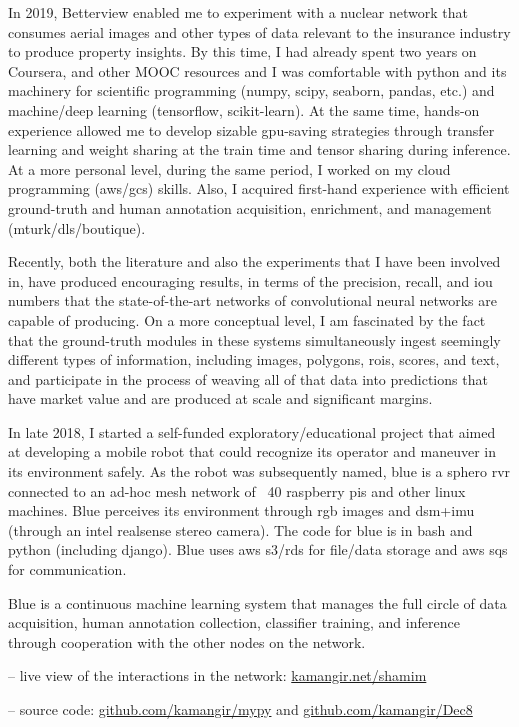 \osspacing
In 2019, Betterview enabled me to experiment with a nuclear network that consumes aerial images and other types of data relevant to the insurance industry to produce property insights. By this time, I had already spent two years on Coursera, and other MOOC resources and I was comfortable with python and its machinery for scientific programming (numpy, scipy, seaborn, pandas, etc.) and machine/deep learning (tensorflow, scikit-learn). At the same time, hands-on experience allowed me to develop sizable gpu-saving strategies through transfer learning and weight sharing at the train time and tensor sharing during inference. At a more personal level, during the same period, I worked on my cloud programming (aws/gcs) skills. Also, I acquired first-hand experience with efficient ground-truth and human annotation acquisition, enrichment, and management (mturk/dls/boutique).

\osspacing
Recently, both the literature and also the experiments that I have been involved in, have produced encouraging results, in terms of the precision, recall, and iou numbers that the state-of-the-art networks of convolutional neural networks are capable of producing. On a more conceptual level, I am fascinated by the fact that the ground-truth modules in these systems simultaneously ingest seemingly different types of information, including images, polygons, rois, scores, and text, and participate in the process of weaving all of that data into predictions that have market value and are produced at scale and significant margins.		


\osspacing
In late 2018, I started a self-funded exploratory/educational project that aimed at developing a mobile robot that could recognize its operator and maneuver in its environment safely. As the robot was subsequently named, blue is a sphero rvr connected to an ad-hoc mesh network of ~40 raspberry pis and other linux machines. Blue perceives its environment through rgb images and dsm+imu (through an intel realsense stereo camera). The code for blue is in bash and python (including django). Blue uses aws s3/rds for file/data storage and aws sqs for communication.

\osspacing
Blue is a continuous machine learning system that manages the full circle of data acquisition, human annotation collection, classifier training, and inference through cooperation with the other nodes on the network. 

-- live view of the interactions in the network: \href{http://kamangir.net/shamim/}{kamangir.net/shamim} 

-- source code: \href{https://github.com/kamangir/mypy}{github.com/kamangir/mypy} and \href{https://github.com/kamangir/Dec8}{github.com/kamangir/Dec8}

